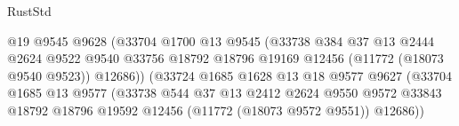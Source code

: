 \begin{lexlean}{RustStd}
\begin{coremodule}
                                            @19
                                            @9545
                                            @9628
                                            (@33704
                                              @1700
                                              @13
                                              @9545
                                              (@33738
                                                @384
                                                @37
                                                @13
                                                @2444
                                                @2624
                                                @9522
                                                @9540
                                                @33756
                                                @18792
                                                @18796
                                                @19169
                                                @12456
                                                (@11772 (@18073 @9540 @9523))
                                                @12686))
                                            (@33724
                                              @1685
                                              @1628
                                              @13
                                              @18
                                              @9577
                                              @9627
                                              (@33704
                                                @1685
                                                @13
                                                @9577
                                                (@33738
                                                  @544
                                                  @37
                                                  @13
                                                  @2412
                                                  @2624
                                                  @9550
                                                  @9572
                                                  @33843
                                                  @18792
                                                  @18796
                                                  @19592
                                                  @12456
                                                  (@11772 (@18073 @9572 @9551))
                                                  @12686))

\end{coremodule}
\end{lexlean}
